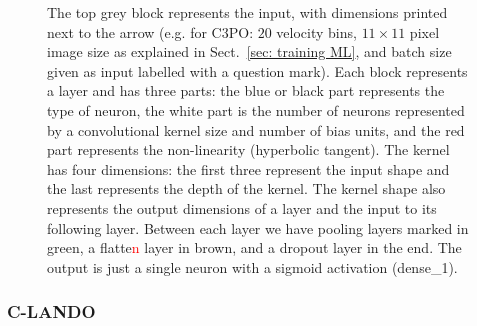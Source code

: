 \documentclass{aa}
\begin{document}
\begin{figure}[!t]
{    The top grey block represents the input, with dimensions printed next to the arrow (e.g. for C3PO: $20$ velocity bins, $11\times11$ pixel image size as explained in Sect.~\ref{sec: training ML}, and batch size given as input labelled with a question mark).
    Each block represents a layer and has three parts: the blue or black part represents the type of neuron, the white part is the number of neurons represented by a convolutional kernel size and number of bias units, and the red part represents the non-linearity (hyperbolic tangent).
    The kernel has four dimensions:   the first three represent the input shape and the last  represents the depth of the kernel.
    The kernel shape also represents the output dimensions of a layer and the input to its following layer. %
    Between each layer we have pooling layers marked in green, a flatte\textcolor{red}{n} layer in brown, and a dropout layer in the end. 
    The output is just a single neuron with a sigmoid activation (dense\_1).}
    \label{fig:c3po schematic}
\end{figure}

\subsubsection{C-LANDO}
\end{document}
